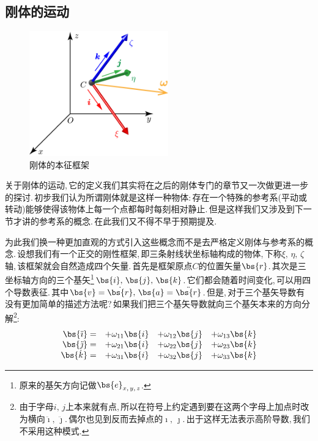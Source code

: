 \subsection{刚体的运动}

\begin{figure}\label{6-1-8}
\vspace{-1.5cm}
\centering
\includegraphics[width=6cm]{image/6-1-8.png}
\caption{刚体的本征框架}
\end{figure}
关于刚体的运动,\,它的定义我们其实将在之后的刚体专门的章节又一次做更进一步的探讨.\,初步我们认为所谓刚体就是这样一种物体:\,存在一个特殊的参考系(平动或转动)能够使得该物体上每一个点都每时每刻相对静止.\,但是这样我们又涉及到下一节才讲的参考系的概念.\,在此我们又不得不早于预期提及.


为此我们换一种更加直观的方式引入这些概念而不是去严格定义刚体与参考系的概念.\,设想我们有一个正交的刚性框架,\,即三条射线状坐标轴构成的物体,\,下称$\xi,\,\eta,\,\zeta$轴,\,该框架就会自然造成四个矢量.\,首先是框架原点$C$的位置矢量$\bs{r}$.\,其次是三坐标轴方向的三个基矢\footnote{原来的基矢方向记做$\bs{e}_{x,\,y,\,z}$.}$\bs{i},\,\bs{j},\,\bs{k}$.\,它们都会随着时间变化,\,可以用四个导数表征.\,其中$\bs{v}=\dot{\bs{r}},\,\bs{a}=\ddot{\bs{r}}$.\,但是,\,对于三个基矢导数有没有更加简单的描述方法呢?\,如果我们把三个基矢导数就向三个基矢本来的方向分解\footnote{由于字母$i,\,j$上本来就有点,\,所以在符号上约定遇到要在这两个字母上加点时改为横向$\ddot{\imath},\,\ddot{\jmath}$.\,偶尔也见到反而去掉点的$\imath,\,\jmath$.\,出于这样无法表示高阶导数,\,我们不采用这种模式.}:
\[\begin{array}{rlll}
\bs{\ddot{\imath}}=		&	+\omega_{11}\bs{i} 	&	+\omega_{12}\bs{j} 		& +\omega_{13}\bs{k}\\
\bs{\ddot{\jmath}}=		&	+\omega_{21}\bs{i} 	&	+\omega_{22}\bs{j} 		& +\omega_{23}\bs{k}\\
\bs{\dot{k}}=				&	+\omega_{31}\bs{i} 	&	+\omega_{32}\bs{j} 		& +\omega_{33}\bs{k}
\end{array}\]

